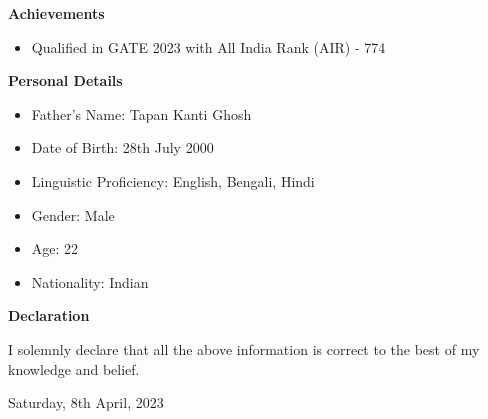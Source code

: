 \documentclass[a4paper,10pt]{article}
\newcommand{\resitem}[1]{\item #1}
\newcommand{\resheading}[1]{\vspace{0.5em} {\small \colorbox{mygrey}{{\begin{minipage}{0.975\textwidth}{{\textbf{#1}}}\end{minipage}}}} \vspace{0.5em}}
\begin{document}
\resheading{Achievements}
\begin{itemize}[nosep]
    \resitem{Qualified in GATE 2023 with All India Rank (AIR) - 774}
\end{itemize}

\resheading{Personal Details}
\begin{itemize}[nosep]
    \resitem{Father’s Name: Tapan Kanti Ghosh}
    \resitem{Date of Birth: 28th July 2000}
    \resitem{Linguistic Proficiency: English, Bengali, Hindi}
    \resitem{Gender: Male}
    \resitem{Age: 22}
    \resitem{Nationality: Indian}
\end{itemize}

\resheading{Declaration}
I solemnly declare that all the above information is correct to the best of my knowledge and belief.

\vspace{0.5cm}
Saturday, 8th April, 2023
\end{document}
